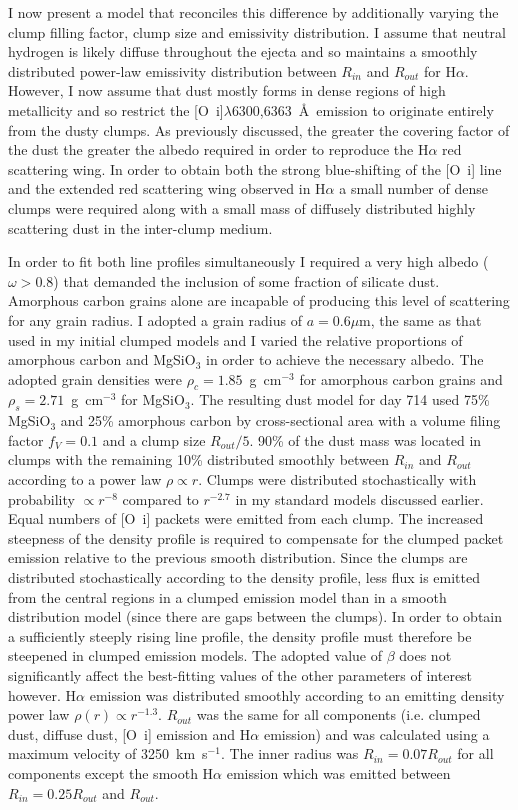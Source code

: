 I now present a model that reconciles this difference by additionally varying the clump filling factor, clump size and emissivity distribution.  I assume that neutral hydrogen is likely diffuse throughout the ejecta and so maintains a smoothly distributed power-law emissivity distribution between $R_{in}$ and $R_{out}$ for H$\alpha$.  However, I now assume that dust mostly forms in dense regions of high metallicity and so restrict the [O~{\sc i}]$\lambda$6300,6363~\AA\ emission to originate entirely from the dusty clumps.  As previously discussed, the greater the covering factor of the dust the greater the albedo required in order to reproduce the H$\alpha$ red scattering wing. In order to obtain both the strong blue-shifting of the [O~{\sc i}] line and the extended red scattering wing observed in H$\alpha$ a small number of dense clumps were required along with a small mass of diffusely distributed highly scattering dust in the inter-clump medium.


In order to fit both line profiles simultaneously I required a very high albedo ($\omega > 0.8$) that demanded the inclusion of some fraction of silicate dust. Amorphous carbon grains alone are incapable of producing this level of scattering for any grain radius.  I adopted a grain radius of $a=0.6\mu$m, the same as that used in my initial clumped models and I varied the relative proportions of amorphous carbon and MgSiO$_3$ in order to achieve the necessary albedo.  The adopted grain densities were $\rho_c=1.85$~g~cm$^{-3}$ for amorphous carbon grains and $\rho_s = 2.71$~g~cm$^{-3}$ for MgSiO$_3$.  The resulting dust model for day 714 used 75\% MgSiO$_3$ and 25\% amorphous carbon by cross-sectional area with a volume filing factor $f_V=0.1$ and a clump size $R_{out}/5$.  90\% of the dust mass was located in clumps with the remaining 10\% distributed smoothly between $R_{in}$ and $R_{out}$ according to a power law $\rho \propto r$. Clumps were distributed stochastically with probability $\propto r^{-8}$ compared to $r^{-2.7}$ in my standard models discussed earlier. Equal numbers of [O~{\sc i}] packets were emitted from each clump. The increased steepness of the density profile is required to compensate for the clumped packet emission relative to the previous smooth distribution.  Since the clumps are distributed stochastically according to the density profile, less flux is emitted from the central regions in a clumped emission model than in a smooth distribution model (since there are gaps between the clumps).  In order to obtain a sufficiently steeply rising line profile, the density profile must therefore be steepened in clumped emission models. The adopted value of $\beta$ does not significantly affect the best-fitting values of the other parameters of interest however.  H$\alpha$ emission was distributed smoothly according to an emitting density power law $\rho(r) \propto r^{-1.3}$.  $R_{out}$ was the same for all components (i.e. clumped dust, diffuse dust, [O~{\sc i}] emission and H$\alpha$ emission) and was calculated using a maximum velocity of 3250~km~s$^{-1}$.  The inner radius was $R_{in} = 0.07 R_{out}$ for all components except the smooth H$\alpha$ emission which was emitted between $R_{in}=0.25R_{out}$ and $R_{out}$.  

